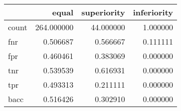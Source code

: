 \begin{tabular}{lrrr}
\toprule
{} &       equal &  superiority &  inferiority \\
\midrule
count &  264.000000 &    44.000000 &     1.000000 \\
fnr   &    0.506687 &     0.566667 &     0.111111 \\
fpr   &    0.460461 &     0.383069 &     0.000000 \\
tnr   &    0.539539 &     0.616931 &     0.000000 \\
tpr   &    0.493313 &     0.211111 &     0.000000 \\
bacc  &    0.516426 &     0.302910 &     0.000000 \\
\bottomrule
\end{tabular}
